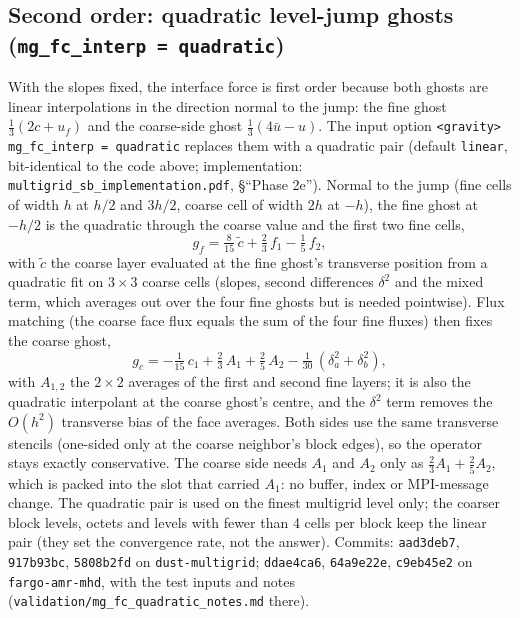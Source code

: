 \documentclass[11pt]{article}
\newcommand{\code}[1]{\texttt{#1}}
\newcommand{\file}[1]{\texttt{#1}}
\begin{document}
\subsection{Second order: quadratic level-jump ghosts (\code{mg\_fc\_interp = quadratic})}
\label{sec:fcquad}
With the slopes fixed, the interface force is first order because both ghosts are linear
interpolations in the direction normal to the jump: the fine ghost $\tfrac13(2c + u_f)$ and the
coarse-side ghost $\tfrac13(4\bar u - u)$. The input option
\code{<gravity> mg\_fc\_interp = quadratic} replaces them with a quadratic pair (default
\code{linear}, bit-identical to the code above; implementation: \file{multigrid\_sb\_implementation.pdf},
\S``Phase 2e''). Normal to the jump (fine cells of width $h$ at $h/2$ and $3h/2$, coarse cell
of width $2h$ at $-h$), the fine ghost at $-h/2$ is the quadratic through the coarse value and the
first two fine cells,
\begin{equation}
g_f = \tfrac{8}{15}\,\tilde c + \tfrac23\,f_1 - \tfrac15\,f_2,
\end{equation}
with $\tilde c$ the coarse layer evaluated at the fine ghost's transverse position from a
quadratic fit on $3\times3$ coarse cells (slopes, second differences $\delta^2$ and the mixed
term, which averages out over the four fine ghosts but is needed pointwise). Flux matching
(the coarse face flux equals the sum of the four fine fluxes) then fixes the coarse ghost,
\begin{equation}
g_c = -\tfrac{1}{15}\,c_1 + \tfrac23\,A_1 + \tfrac25\,A_2 - \tfrac{1}{30}\,(\delta^2_a + \delta^2_b),
\end{equation}
with $A_{1,2}$ the $2\times2$ averages of the first and second fine layers; it is also the
quadratic interpolant at the coarse ghost's centre, and the $\delta^2$ term removes the $O(h^2)$
transverse bias of the face averages. Both sides use the same transverse stencils (one-sided only
at the coarse neighbor's block edges), so the operator stays exactly conservative. The coarse
side needs $A_1$ and $A_2$ only as $\tfrac23 A_1 + \tfrac25 A_2$, which is packed into the slot
that carried $A_1$: no buffer, index or MPI-message change. The quadratic pair is used on the
finest multigrid level only; the coarser block levels, octets and levels with fewer than 4 cells
per block keep the linear pair (they set the convergence rate, not the answer). Commits:
\code{aad3deb7}, \code{917b93bc}, \code{5808b2fd} on \code{dust-multigrid}; \code{ddae4ca6},
\code{64a9e22e}, \code{c9eb45e2} on \code{fargo-amr-mhd}, with the test inputs and notes
(\file{validation/mg\_fc\_quadratic\_notes.md} there).
\end{document}
